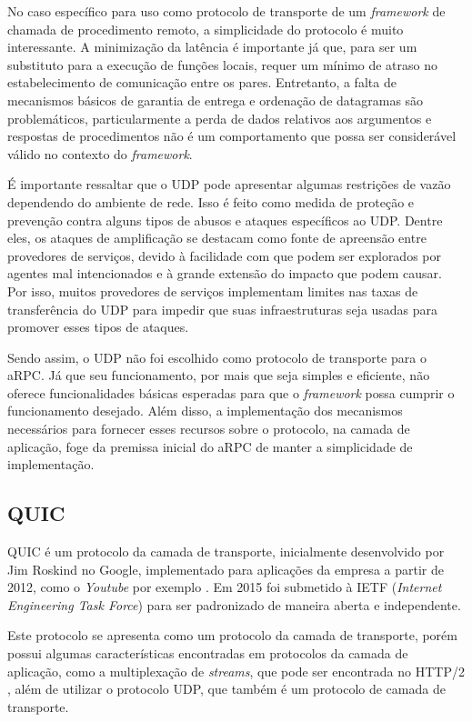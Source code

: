 No caso específico para uso como protocolo de transporte de um \textit{framework} de chamada de procedimento remoto, a simplicidade do protocolo é muito interessante. A minimização da latência é importante já que, para ser um substituto para a execução de funções locais, requer um mínimo de atraso no estabelecimento de comunicação entre os pares. Entretanto, a falta de mecanismos básicos de garantia de entrega e ordenação de datagramas são problemáticos, particularmente a perda de dados relativos aos argumentos e respostas de procedimentos não é um comportamento que possa ser considerável válido no contexto do \textit{framework}.

É importante ressaltar que o UDP pode apresentar algumas restrições de vazão dependendo do ambiente de rede. Isso é feito como medida de proteção e prevenção contra alguns tipos de abusos e ataques específicos ao UDP. Dentre eles, os ataques de amplificação \cite{rossow2014amplification} se destacam como fonte de apreensão entre provedores de serviços, devido à facilidade com que podem ser explorados por agentes mal intencionados e à grande extensão do impacto que podem causar. Por isso, muitos provedores de serviços implementam limites nas taxas de transferência do UDP para impedir que suas infraestruturas seja usadas para promover esses tipos de ataques.

Sendo assim, o UDP não foi escolhido como protocolo de transporte para o aRPC. Já que seu funcionamento, por mais que seja simples e eficiente, não oferece funcionalidades básicas esperadas para que o \textit{framework} possa cumprir o funcionamento desejado. Além disso, a implementação dos mecanismos necessários para fornecer esses recursos sobre o protocolo, na camada de aplicação, foge da premissa inicial do aRPC de manter a simplicidade de implementação.

\subsection{QUIC}
\label{subsec:quic}

QUIC é um protocolo da camada de transporte, inicialmente desenvolvido por Jim Roskind no Google, implementado para aplicações da empresa a partir de 2012, como o \textit{Youtube} por exemplo \cite{langley_quic_2017}. Em 2015 foi submetido à IETF (\textit{Internet Engineering Task Force}) para ser padronizado de maneira aberta e independente.

Este protocolo se apresenta como um protocolo da camada de transporte, porém possui algumas características encontradas em protocolos da camada de aplicação, como a multiplexação de \textit{streams}, que pode ser encontrada no HTTP/2 \cite{de_saxce_is_2015}, além de utilizar o protocolo UDP, que também é um protocolo de camada de transporte.

